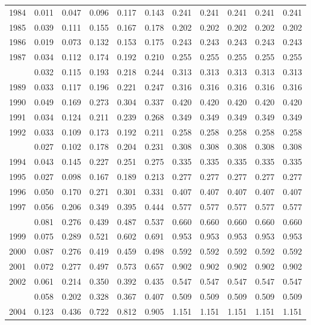 \documentclass[
]{article}
\begin{document}
\begin{longtable}[t]{lrrrrrrrrrr}
1984 & 0.011 & 0.047 & 0.096 & 0.117 & 0.143 & 0.241 & 0.241 & 0.241 & 0.241 & 0.241\\
1985 & 0.039 & 0.111 & 0.155 & 0.167 & 0.178 & 0.202 & 0.202 & 0.202 & 0.202 & 0.202\\
1986 & 0.019 & 0.073 & 0.132 & 0.153 & 0.175 & 0.243 & 0.243 & 0.243 & 0.243 & 0.243\\
1987 & 0.034 & 0.112 & 0.174 & 0.192 & 0.210 & 0.255 & 0.255 & 0.255 & 0.255 & 0.255\\
\addlinespace
1988 & 0.032 & 0.115 & 0.193 & 0.218 & 0.244 & 0.313 & 0.313 & 0.313 & 0.313 & 0.313\\
1989 & 0.033 & 0.117 & 0.196 & 0.221 & 0.247 & 0.316 & 0.316 & 0.316 & 0.316 & 0.316\\
1990 & 0.049 & 0.169 & 0.273 & 0.304 & 0.337 & 0.420 & 0.420 & 0.420 & 0.420 & 0.420\\
1991 & 0.034 & 0.124 & 0.211 & 0.239 & 0.268 & 0.349 & 0.349 & 0.349 & 0.349 & 0.349\\
1992 & 0.033 & 0.109 & 0.173 & 0.192 & 0.211 & 0.258 & 0.258 & 0.258 & 0.258 & 0.258\\
\addlinespace
1993 & 0.027 & 0.102 & 0.178 & 0.204 & 0.231 & 0.308 & 0.308 & 0.308 & 0.308 & 0.308\\
1994 & 0.043 & 0.145 & 0.227 & 0.251 & 0.275 & 0.335 & 0.335 & 0.335 & 0.335 & 0.335\\
1995 & 0.027 & 0.098 & 0.167 & 0.189 & 0.213 & 0.277 & 0.277 & 0.277 & 0.277 & 0.277\\
1996 & 0.050 & 0.170 & 0.271 & 0.301 & 0.331 & 0.407 & 0.407 & 0.407 & 0.407 & 0.407\\
1997 & 0.056 & 0.206 & 0.349 & 0.395 & 0.444 & 0.577 & 0.577 & 0.577 & 0.577 & 0.577\\
\addlinespace
1998 & 0.081 & 0.276 & 0.439 & 0.487 & 0.537 & 0.660 & 0.660 & 0.660 & 0.660 & 0.660\\
1999 & 0.075 & 0.289 & 0.521 & 0.602 & 0.691 & 0.953 & 0.953 & 0.953 & 0.953 & 0.953\\
2000 & 0.087 & 0.276 & 0.419 & 0.459 & 0.498 & 0.592 & 0.592 & 0.592 & 0.592 & 0.592\\
2001 & 0.072 & 0.277 & 0.497 & 0.573 & 0.657 & 0.902 & 0.902 & 0.902 & 0.902 & 0.902\\
2002 & 0.061 & 0.214 & 0.350 & 0.392 & 0.435 & 0.547 & 0.547 & 0.547 & 0.547 & 0.547\\
\addlinespace
2003 & 0.058 & 0.202 & 0.328 & 0.367 & 0.407 & 0.509 & 0.509 & 0.509 & 0.509 & 0.509\\
2004 & 0.123 & 0.436 & 0.722 & 0.812 & 0.905 & 1.151 & 1.151 & 1.151 & 1.151 & 1.151\\

\end{longtable}
\end{document}
